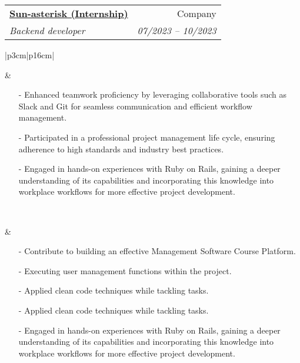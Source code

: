 \documentclass[letterpaper, 11pt]{article}
\makeatletter
\newcommand{\resumeSubheading}[4]{
  \vspace{8pt}
  \item%
  \begin{tabular*}{0.97\textwidth}[t]{l@{\extracolsep{\fill}}r}
    \textbf{#1}	  & #2		       \\
    \textit{\small#3} & \textit{\small #4} \\
  \end{tabular*}
  \vspace{-5pt}
}
\makeatother
\begin{document}
\resumeSubheading {\href{https://sun-asterisk.vn/}{Sun-asterisk
    (Internship)}}{Company}
{Backend developer}{07/2023 – 10/2023}
\vspace{5pt}

\begin{tabular}{|p{3cm}|p{16cm}|}

  \hline
  \hspace{5pt} %
  \vspace{20pt}

       &
  \begin{minipage}[t]{\linewidth}
    \begin{itemize}[leftmargin=*]
      \item[-]{Enhanced teamwork proficiency by leveraging collaborative
                  tools such as Slack and Git for seamless communication and efficient workflow
                  management.}
      \item[-]{Participated in a professional project management life
                  cycle, ensuring adherence to high standards and industry best practices.}
      \item[-]{Engaged in hands-on experiences with Ruby on Rails, gaining
                  a deeper understanding of its capabilities and incorporating this knowledge
                  into workplace workflows for more effective project development.}
    \end{itemize}
  \end{minipage}                  \\
  \hline
  \hspace{5pt} %
  \vspace{5pt}

   &
  \begin{minipage}[t]{\linewidth}
    \begin{itemize}[leftmargin=*]
      \item[-]{Contribute to building an effective Management Software Course
                  Platform.}
      \item[-]{ Executing user management functions within the project.}
      \item[-]{ Applied clean code techniques while tackling tasks.}
      \item[-]{ Applied clean code techniques while tackling tasks.}
      \item[-]{Engaged in hands-on experiences with Ruby on Rails, gaining
                  a deeper understanding of its capabilities and incorporating this knowledge
                  into workplace workflows for more effective project development.}


\end{itemize}
\end{minipage}
\end{tabular}
\end{document}
